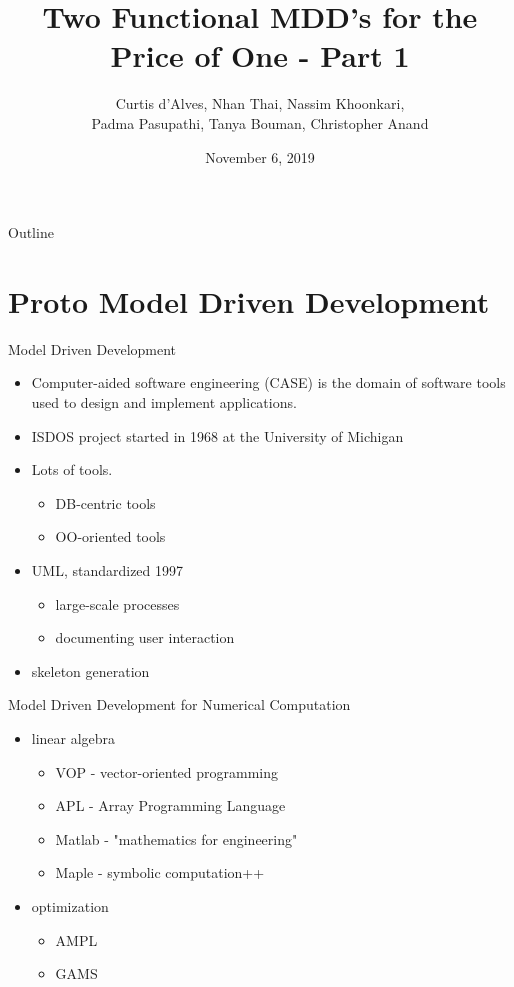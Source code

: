 \documentclass[presentation]{beamer}
\author{Curtis d'Alves, Nhan Thai, Nassim Khoonkari, \\ Padma Pasupathi, Tanya Bouman, Christopher Anand}
\date{November 6, 2019}
\title{Two Functional MDD's for the Price of One - Part 1}
\begin{document}
\maketitle
\begin{frame}{Outline}
\tableofcontents
\end{frame}


\section{Proto Model Driven Development}
\label{sec:orgf064032}
\begin{frame}[label={sec:org9c2735a}]{Model Driven Development}
\begin{itemize}
\item Computer-aided software engineering (CASE) is the domain of software tools used to design and implement applications.
\item ISDOS project started in 1968 at the University of Michigan
\item Lots of tools.
  \begin{itemize}
  \item DB-centric tools
  \item OO-oriented tools
  \end{itemize}
\item UML, standardized 1997
  \begin{itemize}
  \item large-scale processes
  \item documenting user interaction
  \end{itemize}
\item skeleton generation    
\end{itemize}
\end{frame}
\begin{frame}{Model Driven Development for Numerical Computation}
\begin{itemize}
\item linear algebra
  \begin{itemize}
  \item VOP - vector-oriented programming
  \item APL - Array Programming Language
  \item Matlab - "mathematics for engineering"
  \item Maple - symbolic computation++
  \end{itemize}
\item optimization
  \begin{itemize}
  \item AMPL
  \item GAMS
  \end{itemize}
\end{itemize}
\end{frame}
\end{document}
